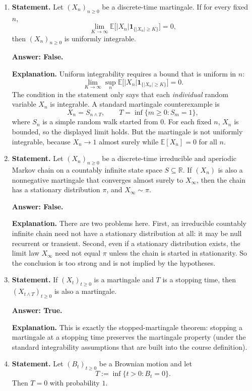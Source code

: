 \documentclass[11pt]{article}
\theoremstyle{definition}
\begin{document}
\begin{enumerate}[label=(\arabic*)]
\item \textbf{Statement.} Let \((X_n)_{n\ge 0}\) be a discrete-time martingale. If for every fixed \(n\),
\[
\lim_{K\to\infty}\mathbb E\!\bigl[|X_n|\mathbf 1_{\{|X_n|\ge K\}}\bigr]=0,
\]
then \((X_n)_{n\ge 0}\) is uniformly integrable.

\textbf{Answer: False.}

\textbf{Explanation.}
Uniform integrability requires a bound that is uniform in \(n\):
\[
\lim_{K\to\infty}\sup_n \mathbb E\!\bigl[|X_n|\mathbf 1_{\{|X_n|\ge K\}}\bigr]=0.
\]
The condition in the statement only says that each \emph{individual} random variable \(X_n\) is integrable.
A standard martingale counterexample is
\[
X_n=S_{n\wedge T},
\qquad
T=\inf\{m\ge 0:S_m=1\},
\]
where \(S_n\) is a simple random walk started from \(0\). For each fixed \(n\), \(X_n\) is bounded, so the displayed limit holds. But the martingale is not uniformly integrable, because \(X_n\to 1\) almost surely while \(\mathbb E[X_n]=0\) for all \(n\).

\item \textbf{Statement.} Let \((X_n)_{n\ge 0}\) be a discrete-time irreducible and aperiodic Markov chain on a countably infinite state space \(S\subseteq \mathbb R\). If \((X_n)\) is also a nonnegative martingale that converges almost surely to \(X_\infty\), then the chain has a stationary distribution \(\pi\), and \(X_\infty\sim \pi\).

\textbf{Answer: False.}

\textbf{Explanation.}
There are two problems here. First, an irreducible countably infinite chain need not have a stationary distribution at all: it may be null recurrent or transient. Second, even if a stationary distribution exists, the limit law \(X_\infty\) need not equal \(\pi\) unless the chain is started in stationarity.
So the conclusion is too strong and is not implied by the hypotheses.

\item \textbf{Statement.} If \((X_t)_{t\ge 0}\) is a martingale and \(T\) is a stopping time, then \((X_{t\wedge T})_{t\ge 0}\) is also a martingale.

\textbf{Answer: True.}

\textbf{Explanation.}
This is exactly the stopped-martingale theorem: stopping a martingale at a stopping time preserves the martingale property (under the standard integrability assumptions that are built into the course definition).

\item \textbf{Statement.} Let \((B_t)_{t\ge 0}\) be a Brownian motion and let
\[
T:=\inf\{t>0:B_t=0\}.
\]
Then \(T=0\) with probability \(1\).


\end{enumerate}
\end{document}
